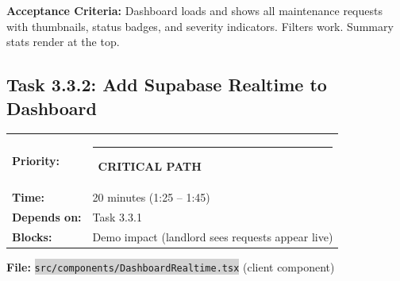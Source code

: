 \documentclass[11pt, a4paper]{article}
\newcommand{\critical}{\textcolor{critred}{\rule{6pt}{6pt}}~\textcolor{critred}{\scriptsize\textbf{CRITICAL PATH}}}
\newcommand{\code}[1]{\texttt{\small\colorbox{lightgray}{#1}}}
\begin{document}
\textbf{Acceptance Criteria:} Dashboard loads and shows all maintenance requests with thumbnails, status badges, and severity indicators. Filters work. Summary stats render at the top.

\vspace{1em}

\subsection{Task 3.3.2: Add Supabase Realtime to Dashboard}

\begin{tabularx}{\textwidth}{lX}
\textbf{Priority:} & \critical \\
\textbf{Time:} & 20 minutes (1:25 -- 1:45) \\
\textbf{Depends on:} & Task 3.3.1 \\
\textbf{Blocks:} & Demo impact (landlord sees requests appear live) \\
\end{tabularx}

\vspace{0.3em}

\textbf{File:} \code{src/components/DashboardRealtime.tsx} (client component)
\end{document}
